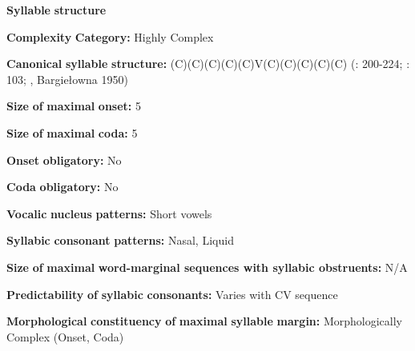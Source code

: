 \begin{styleBody}
\textbf{Syllable} \textbf{structure}
\end{styleBody}

\begin{styleBody}
\textbf{Complexity} \textbf{Category:} Highly Complex
\end{styleBody}

\begin{styleBody}
\textbf{Canonical} \textbf{syllable} \textbf{structure:} (C)(C)(C)(C)(C)V(C)(C)(C)(C)(C) (\citealt{Gussman2007}: 200-224; \citealt{Jassem2003}: 103; \citealt{Zydorowicz2010}, Bargiełowna 1950)
\end{styleBody}

\begin{styleBody}
\textbf{Size} \textbf{of} \textbf{maximal} \textbf{onset:} 5
\end{styleBody}

\begin{styleBody}
\textbf{Size} \textbf{of} \textbf{maximal} \textbf{coda:} 5
\end{styleBody}

\begin{styleBody}
\textbf{Onset} \textbf{obligatory:} No
\end{styleBody}

\begin{styleBody}
\textbf{Coda} \textbf{obligatory:} No
\end{styleBody}

\begin{styleBody}
\textbf{Vocalic} \textbf{nucleus} \textbf{patterns:} Short vowels
\end{styleBody}

\begin{styleBody}
\textbf{Syllabic} \textbf{consonant} \textbf{patterns:} Nasal, Liquid
\end{styleBody}

\begin{styleBody}
\textbf{Size} \textbf{of} \textbf{maximal} \textbf{word{}-marginal sequences with syllabic obstruents:} N/A
\end{styleBody}

\begin{styleBody}
\textbf{Predictability} \textbf{of} \textbf{syllabic} \textbf{consonants:} Varies with CV sequence
\end{styleBody}

\begin{styleBody}
\textbf{Morphological} \textbf{constituency} \textbf{of} \textbf{maximal} \textbf{syllable} \textbf{margin:} Morphologically Complex (Onset, Coda)
\end{styleBody}

